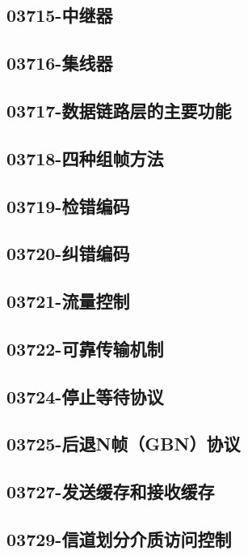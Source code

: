\subsection{03715-中继器}

\subsection{03716-集线器}

\subsection{03717-数据链路层的主要功能}

\subsection{03718-四种组帧方法}

\subsection{03719-检错编码}

\subsection{03720-纠错编码}

\subsection{03721-流量控制}

\subsection{03722-可靠传输机制}

\subsection{03724-停止等待协议}

\subsection{03725-后退N帧（GBN）协议}

\subsection{03727-发送缓存和接收缓存}

\subsection{03729-信道划分介质访问控制}

